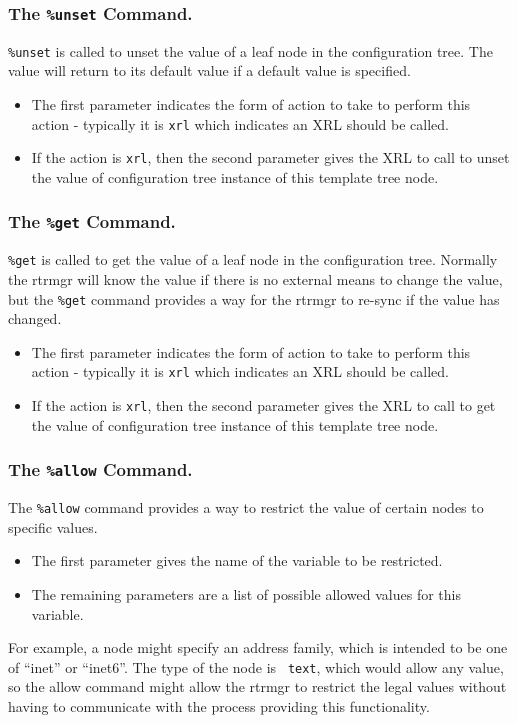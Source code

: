 \documentclass[11pt]{article}
\begin{document}
\subsubsection{The {\tt \%unset} Command.}
{\tt \%unset} is called to unset the value of a leaf node in the
configuration tree.  The value will return to its default value if a
default value is specified.
\begin{itemize}
\item The first parameter indicates the form of action to take to perform
this action - typically it is {\tt xrl} which indicates an XRL should
be called.
\item If the action is {\tt xrl}, then the second parameter gives the XRL to
call to unset the value of configuration tree instance of this template
tree node.
\end{itemize}
\subsubsection{The {\tt \%get} Command.}
{\tt \%get} is called to get the value of a leaf node in the
configuration tree.  Normally the rtrmgr will know the value if there
is no external means to change the value, but the {\tt \%get} command
provides a way for the rtrmgr to re-sync if the value has changed.
\begin{itemize}
\item The first parameter indicates the form of action to take to perform
this action - typically it is {\tt xrl} which indicates an XRL should
be called.
\item If the action is {\tt xrl}, then the second parameter gives the XRL to
call to get the value of configuration tree instance of this template
tree node.
\end{itemize}
\subsubsection{The {\tt \%allow} Command.}
The {\tt \%allow} command provides a way to restrict the value of
certain nodes to specific values.
\begin{itemize}
\item The first parameter gives the name of the variable to be restricted.
\item The remaining parameters are a list of possible allowed values for
this variable.
\end{itemize}
For example, a node might specify an address family, which is intended
to be one of ``inet'' or ``inet6''.  The type of the node is {\tt
text}, which would allow any value, so the allow command might allow
the rtrmgr to restrict the legal values without having to
communicate with the process providing this functionality.
\end{document}
